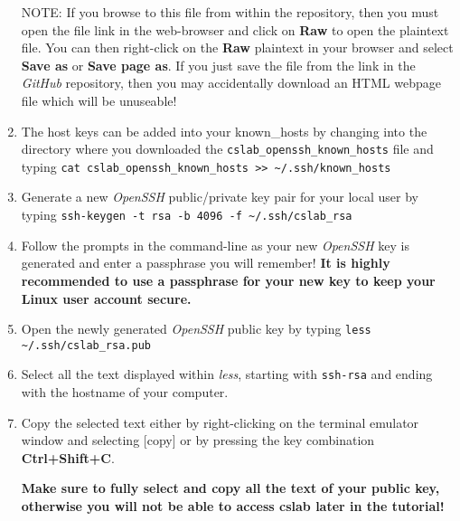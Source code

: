 \documentclass[12pt]{article}
\begin{document}
\begin{flushleft}
\begin{enumerate}
    NOTE: If you browse to this file from within the repository, then you must open the file link in the web-browser and click on \textbf{Raw} to open the plaintext file. You can then right-click on the \textbf{Raw} plaintext in your browser and select \textbf{Save as} or \textbf{Save page as}. If you just save the file from the link in the \textit{GitHub} repository, then you may accidentally download an HTML webpage file which will be unuseable!

  \item The host keys can be added into your known\_hosts by changing into the directory where you downloaded the \verb|cslab_openssh_known_hosts| file and typing \break
    \verb|cat cslab_openssh_known_hosts >> ~/.ssh/known_hosts|
  \item Generate a new \textit{OpenSSH} public/private key pair for your local user by typing \break
    \verb|ssh-keygen -t rsa -b 4096 -f ~/.ssh/cslab_rsa|
  \item Follow the prompts in the command-line as your new \textit{OpenSSH} key is generated and enter a passphrase you will remember! \break
  \textbf{It is highly recommended to use a passphrase for your new key to keep your Linux user account secure.}
  
  \item Open the newly generated \textit{OpenSSH} public key by typing \break
    \verb|less ~/.ssh/cslab_rsa.pub|
  \item Select all the text displayed within \textit{less}, starting with \texttt{ssh-rsa} and ending with the hostname of your computer. 
  \item Copy the selected text either by right-clicking on the terminal emulator window and selecting [copy] or by pressing the key combination \textbf{Ctrl+Shift+C}.

    {\bf Make sure to fully select and copy all the text of your public key, otherwise you will not be able to access cslab later in the tutorial!}
    

\end{enumerate}
\end{flushleft}
\end{document}
